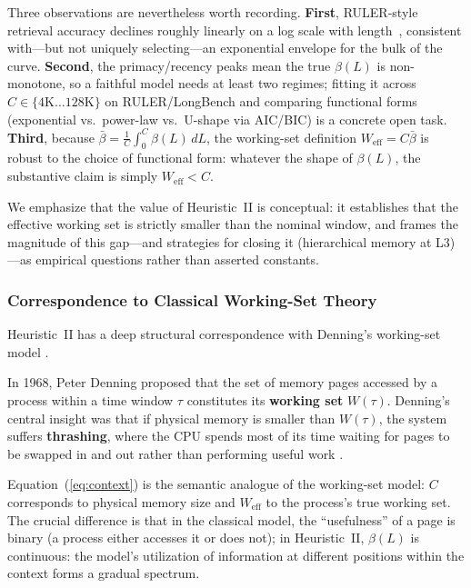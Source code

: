 Three observations are nevertheless worth recording. \textbf{First}, RULER-style retrieval accuracy declines roughly linearly on a log scale with length~\cite{ruler2024}, consistent with---but not uniquely selecting---an exponential envelope for the bulk of the curve. \textbf{Second}, the primacy/recency peaks mean the true $\beta(L)$ is non-monotone, so a faithful model needs at least two regimes; fitting it across $C \in \{4\mathrm{K}\dots128\mathrm{K}\}$ on RULER/LongBench and comparing functional forms (exponential vs.\ power-law vs.\ U-shape via AIC/BIC) is a concrete open task. \textbf{Third}, because $\bar{\beta} = \tfrac{1}{C}\int_0^C \beta(L)\,dL$, the working-set definition $W_{\mathrm{eff}} = C\bar{\beta}$ is robust to the choice of functional form: whatever the shape of $\beta(L)$, the substantive claim is simply $W_{\mathrm{eff}} < C$.

We emphasize that the value of Heuristic~II is conceptual: it establishes that the effective working set is strictly smaller than the nominal window, and frames the magnitude of this gap---and strategies for closing it (hierarchical memory at L3)---as empirical questions rather than asserted constants.

\subsubsection{Correspondence to Classical Working-Set Theory}

Heuristic~II has a deep structural correspondence with Denning's working-set model \cite{denning1968thrashing}.

In 1968, Peter Denning proposed that the set of memory pages accessed by a process within a time window $\tau$ constitutes its \textbf{working set} $W(\tau)$. Denning's central insight was that if physical memory is smaller than $W(\tau)$, the system suffers \textbf{thrashing}, where the CPU spends most of its time waiting for pages to be swapped in and out rather than performing useful work \cite{denning1968thrashing,denning2020workingset}.

Equation~(\ref{eq:context}) is the semantic analogue of the working-set model: $C$ corresponds to physical memory size and $W_{\mathrm{eff}}$ to the process's true working set. The crucial difference is that in the classical model, the ``usefulness'' of a page is binary (a process either accesses it or does not); in Heuristic~II, $\beta(L)$ is continuous: the model's utilization of information at different positions within the context forms a gradual spectrum.

